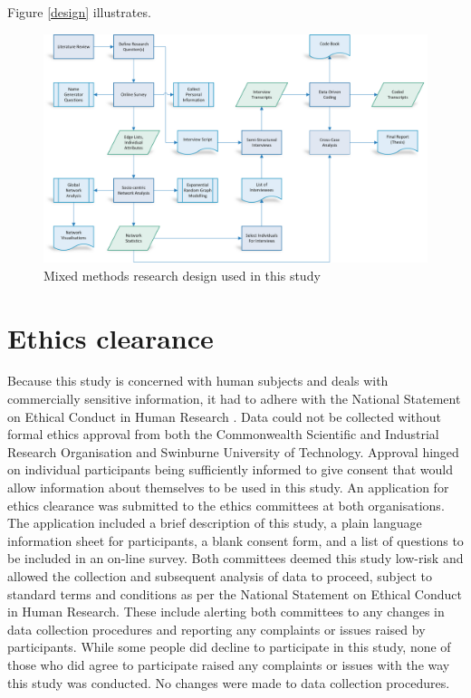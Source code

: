 Figure \ref{design} illustrates.

\begin{landscape}
	\begin{figure}
		\centering
		\label{design}
		\includegraphics[width=1.0\linewidth]{Images/ResearchPlan_20160909}
		\caption{Mixed methods research design used in this study}
		\label{fig:researchplan20160402}
	\end{figure}
\end{landscape}


\section{Ethics clearance}

Because this study is concerned with human subjects and deals with commercially sensitive information, it had to adhere with the National Statement on Ethical Conduct in Human Research \citep{national2007national}. Data could not be collected without formal ethics approval from both the Commonwealth Scientific and Industrial Research Organisation and Swinburne University of Technology. Approval hinged on individual participants being sufficiently informed to give consent that would allow information about themselves to be used in this study. An application for ethics clearance was submitted to the ethics committees at both organisations. The application included a brief description of this study, a plain language information sheet for participants, a blank consent form, and a list of questions to be included in an on-line survey. Both committees deemed this study low-risk and allowed the collection and subsequent analysis of data to proceed, subject to standard terms and conditions as per the National Statement on Ethical Conduct in Human Research. These include alerting both committees to any changes in data collection procedures and reporting any complaints or issues raised by participants. While some people did decline to participate in this study, none of those who did agree to participate raised any complaints or issues with the way this study was conducted. No changes were made to data collection procedures. \medskip

